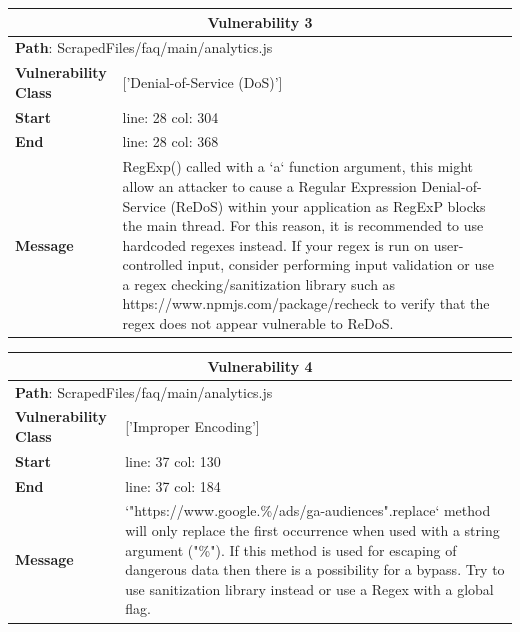 \documentclass[12pt]{article}
\begin{document}
\vspace{0.7cm}
\FloatBarrier
\begin{table}[!h]
\centering
\renewcommand{\arraystretch}{1.3}
\begin{tabular}{|l|p{10cm}|}
\hline
\multicolumn{2}{|c|}{\textbf{Vulnerability 3}} \\
\hline
\multicolumn{2}{|l|}{\textbf{Path}: ScrapedFiles/faq/main/analytics.js} \\
\hline
\textbf{Vulnerability Class} & ['Denial-of-Service (DoS)'] \\
\hline
\textbf{Start} & line: 28 \quad col: 304 \\
\hline
\textbf{End} & line: 28 \quad col: 368 \\
\hline
\textbf{Message} & RegExp() called with a `a` function argument, this might allow an attacker to cause a Regular Expression Denial-of-Service (ReDoS) within your application as RegExP blocks the main thread. For this reason, it is recommended to use hardcoded regexes instead. If your regex is run on user-controlled input, consider performing input validation or use a regex checking/sanitization library such as https://www.npmjs.com/package/recheck to verify that the regex does not appear vulnerable to ReDoS. \\
\hline
\end{tabular}
\end{table}
\vspace{0.7cm}
\FloatBarrier
\begin{table}[!h]
\centering
\renewcommand{\arraystretch}{1.3}
\begin{tabular}{|l|p{10cm}|}
\hline
\multicolumn{2}{|c|}{\textbf{Vulnerability 4}} \\
\hline
\multicolumn{2}{|l|}{\textbf{Path}: ScrapedFiles/faq/main/analytics.js} \\
\hline
\textbf{Vulnerability Class} & ['Improper Encoding'] \\
\hline
\textbf{Start} & line: 37 \quad col: 130 \\
\hline
\textbf{End} & line: 37 \quad col: 184 \\
\hline
\textbf{Message} & `"https://www.google.\%/ads/ga-audiences".replace` method will only replace the first occurrence when used with a string argument ("\%"). If this method is used for escaping of dangerous data then there is a possibility for a bypass. Try to use sanitization library instead or use a Regex with a global flag. \\
\hline
\end{tabular}
\end{table}
\end{document}
